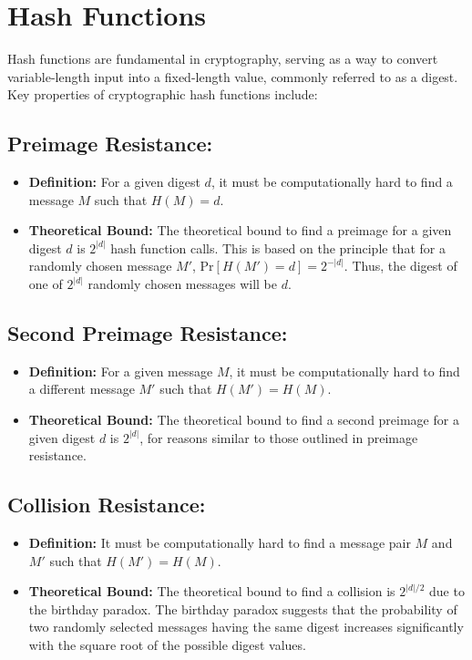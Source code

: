 \documentclass[12pt]{article}
\begin{document}
\section*{Hash Functions}

Hash functions are fundamental in cryptography, serving as a way to convert variable-length input into a fixed-length value, commonly referred to as a digest. Key properties of cryptographic hash functions include:

\subsection*{Preimage Resistance:}
\begin{itemize}
    \item \textbf{Definition:} For a given digest \( d \), it must be computationally hard to find a message \( M \) such that \( H(M) = d \).
    \item \textbf{Theoretical Bound:} The theoretical bound to find a preimage for a given digest \( d \) is \( 2^{|d|} \) hash function calls. This is based on the principle that for a randomly chosen message \( M' \), \( \text{Pr}[H(M')=d]=2^{-|d|} \). Thus, the digest of one of \( 2^{|d|} \) randomly chosen messages will be \( d \).
\end{itemize}

\subsection*{Second Preimage Resistance:}
\begin{itemize}
    \item \textbf{Definition:} For a given message \( M \), it must be computationally hard to find a different message \( M' \) such that \( H(M')=H(M) \).
    \item \textbf{Theoretical Bound:} The theoretical bound to find a second preimage for a given digest \( d \) is \( 2^{|d|} \), for reasons similar to those outlined in preimage resistance.
\end{itemize}

\subsection*{Collision Resistance:}
\begin{itemize}
    \item \textbf{Definition:} It must be computationally hard to find a message pair \( M \) and \( M' \) such that \( H(M')=H(M) \).
    \item \textbf{Theoretical Bound:} The theoretical bound to find a collision is \( 2^{|d|/2} \) due to the birthday paradox. The birthday paradox suggests that the probability of two randomly selected messages having the same digest increases significantly with the square root of the possible digest values.
\end{itemize}
\end{document}

